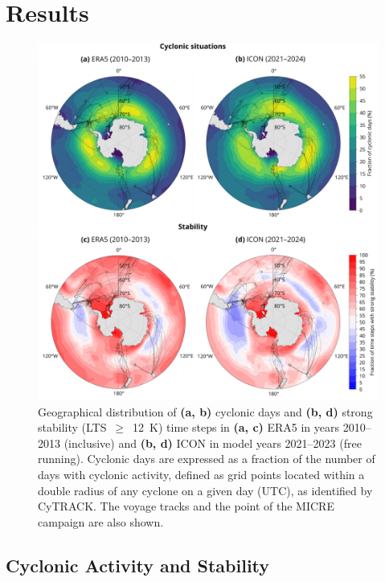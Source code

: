 \documentclass[draft]{agujournal2019}
\begin{document}
\section{Results}
\label{sec:results}

\begin{figure}[p!]
\centering
\includegraphics[width=\textwidth]{img/cyc_stab_dist_rev1.pdf}
\caption{
Geographical distribution of \textbf{(a, b)} cyclonic days and \textbf{(b, d)} strong stability (LTS~$\geq$~12~K) time steps in \textbf{(a, c)} ERA5 in years 2010–2013 (inclusive) and \textbf{(b, d)} ICON in model years 2021–2023 (free running). Cyclonic days are expressed as a fraction of the number of days with cyclonic activity, defined as grid points located within a double radius of any cyclone on a given day (UTC), as identified by CyTRACK. The voyage tracks and the point of the MICRE campaign are also shown.
}
\label{fig:cyclone-stability}
\end{figure}

\subsection{Cyclonic Activity and Stability}
\end{document}
